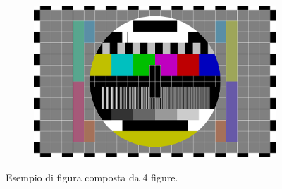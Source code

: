 \begin{figure}[!h]
\begin{subfigure}{0.35\textwidth}
		\caption{}
	\end{subfigure}
	\begin{subfigure}{0.35\textwidth}
		\includegraphics[scale=0.15]{images/test.png}
		\caption{}
	\end{subfigure}
\caption{Esempio di figura composta da 4 figure.}
\end{figure}